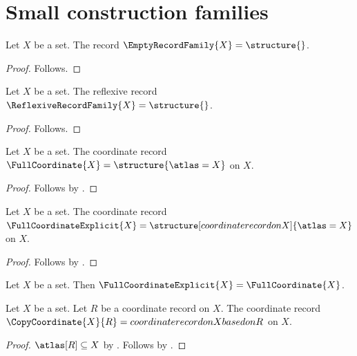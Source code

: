

\section{Small construction families}

\begin{construction}\label{empty_record_family}
    Let $X$ be a set.
    The record $\EmptyRecordFamily{X}=\structure{}$.
\end{construction}
\begin{proof}
    Follows.
\end{proof}

\begin{construction}\label{reflexive_record_family}
    Let $X$ be a set.
    The reflexive record $\ReflexiveRecordFamily{X}=\structure{}$.
\end{construction}
\begin{proof}
    Follows.
\end{proof}

\begin{construction}\label{full_coordinate_family}
    Let $X$ be a set.
    The coordinate record $\FullCoordinate{X}=\structure{\atlas=X}$ on $X$.
\end{construction}
\begin{proof}
    Follows by .
\end{proof}

\begin{construction}\label{full_coordinate_explicit_family}
    Let $X$ be a set.
    The coordinate record $\FullCoordinateExplicit{X}=
        \structure[coordinate record on X]{\atlas=X}$ on $X$.
\end{construction}
\begin{proof}
    Follows by .
\end{proof}

\begin{proposition}\label{coordinate_family_annotation_agrees}
    Let $X$ be a set.
    Then $\FullCoordinateExplicit{X}=\FullCoordinate{X}$.
\end{proposition}

\begin{construction}\label{copy_coordinate_family}
    Let $X$ be a set.
    Let $R$ be a coordinate record on $X$.
    The coordinate record $\CopyCoordinate{X}{R}=
        coordinate record on X based on R$ on $X$.
\end{construction}
\begin{proof}
    $\atlas[R]\subseteq X$ by .
    Follows by .
\end{proof}

